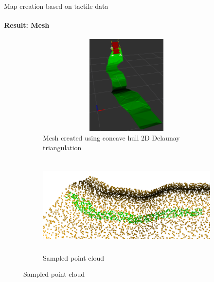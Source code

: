 \documentclass[aspectratio=169]{beamer}
\begin{document}
\begin{frame}[t]{Map creation based on tactile data}
    \framesubtitle{Result: Mesh}
    \vspace{-15pt}
    \begin{figure}[H]
        \begin{subfigure}[t]{0.49\textwidth}
            \centering\includegraphics[height=5cm,width=1\textwidth,keepaspectratio]{mesh_rviz.png}
            \caption*{Mesh created using concave hull 2D Delaunay triangulation}
        \end{subfigure}
        \begin{subfigure}[t]{0.49\textwidth}
            \centering\includegraphics[height=5cm,width=1\textwidth,keepaspectratio]{sampled_pcd.png}
            \caption*{Sampled point cloud}
        \end{subfigure}
    \end{figure}
\end{frame}
\end{document}
